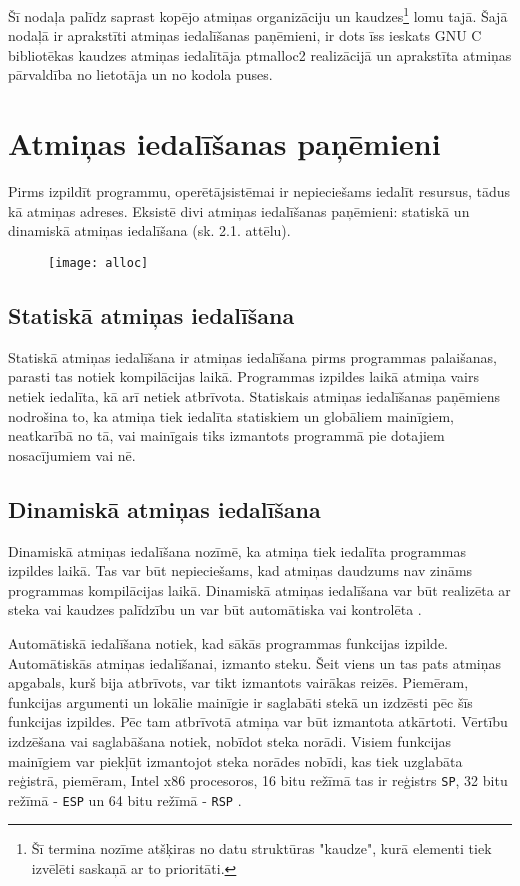 ﻿Šī nodaļa palīdz saprast kopējo atmiņas organizāciju un kaudzes\footnote{Šī termina nozīme atšķiras no datu struktūras "kaudze", kurā elementi tiek izvēlēti saskaņā ar to prioritāti.} lomu tajā. 
Šajā nodaļā ir aprakstīti atmiņas iedalīšanas paņēmieni, ir dots īss ieskats GNU C bibliotēkas kaudzes atmiņas iedalītāja ptmalloc2 realizācijā un aprakstīta atmiņas pārvaldība no lietotāja un no kodola puses.

\section{Atmiņas iedalīšanas paņēmieni}

Pirms izpildīt programmu, operētājsistēmai ir nepieciešams iedalīt resursus, tādus kā atmiņas adreses.  
Eksistē divi atmiņas iedalīšanas paņēmieni: statiskā un dinamiskā atmiņas iedalīšana (sk. 2.1. attēlu). 

\begin{figure}[h]
\begin{center}
\texttt{[image: alloc]}
\end{center}
\caption{\textbf{\fontsize{11}{12}\selectfont {Atmiņas iedalīšanas paņēmienu klasifikācija}}}
\label{fig:alloc}
\end{figure}


\subsection{Statiskā atmiņas iedalīšana}
Statiskā atmiņas iedalīšana ir atmiņas iedalīšana pirms programmas palaišanas, parasti tas notiek kompilācijas laikā.
Programmas izpildes laikā atmiņa vairs netiek iedalīta, kā arī netiek atbrīvota. 
Statiskais atmiņas iedalīšanas paņēmiens nodrošina to, ka atmiņa tiek iedalīta statiskiem un globāliem mainīgiem, neatkarībā no tā, vai mainīgais tiks izmantots programmā pie dotajiem nosacījumiem vai nē.

\subsection{Dinamiskā atmiņas iedalīšana}
Dinamiskā atmiņas iedalīšana nozīmē, ka atmiņa tiek iedalīta programmas izpildes laikā.
Tas var būt nepieciešams, kad atmiņas daudzums nav zināms programmas kompilācijas laikā. 
Dinamiskā atmiņas iedalīšana var būt realizēta ar steka vai kaudzes palīdzību un var būt automātiska vai kontrolēta \cite{SDMA}.

Automātiskā iedalīšana notiek, kad sākās programmas funkcijas izpilde. 
Automātiskās atmiņas iedalīšanai, izmanto steku.
Šeit viens un tas pats atmiņas apgabals, kurš bija atbrīvots, var tikt izmantots  vairākas reizēs. 
Piemēram, funkcijas argumenti un lokālie mainīgie ir saglabāti stekā un izdzēsti pēc šīs funkcijas izpildes. 
Pēc tam atbrīvotā atmiņa var būt izmantota atkārtoti. 
Vērtību izdzēšana vai saglabāšana notiek, nobīdot steka norādi.
Visiem funkcijas mainīgiem var piekļūt izmantojot steka norādes nobīdi, kas tiek uzglabāta reģistrā, piemēram,  
Intel x86 procesoros, 16 bitu režīmā tas ir reģistrs \texttt{SP}, 32 bitu režīmā - \texttt{ESP} un 64 bitu režīmā - \texttt{RSP} \cite{JCL}.


